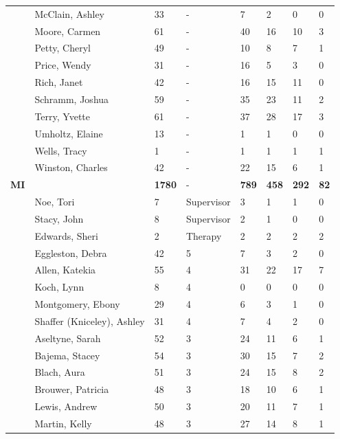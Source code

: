 \documentclass{article}\usepackage[]{graphicx}\usepackage[]{color}
\begin{document}
{\begin{longtable} { >{\raggedright}p{}p{}p{}p{}p{}p{}p{}p{}}
   \rowcolor[gray]{0.90} & McClain, Ashley & 33 & - & 7 & 2 & 0 & 0 \\ 
   \rowcolor[gray]{0.90} & Moore, Carmen & 61 & - & 40 & 16 & 10 & 3 \\ 
   \rowcolor[gray]{0.90} & Petty, Cheryl & 49 & - & 10 & 8 & 7 & 1 \\ 
   & Price, Wendy & 31 & - & 16 & 5 & 3 & 0 \\ 
   & Rich, Janet & 42 & - & 16 & 15 & 11 & 0 \\ 
   & Schramm, Joshua & 59 & - & 35 & 23 & 11 & 2 \\ 
   \rowcolor[gray]{0.90} & Terry, Yvette & 61 & - & 37 & 28 & 17 & 3 \\ 
   \rowcolor[gray]{0.90} & Umholtz, Elaine & 13 & - & 1 & 1 & 0 & 0 \\ 
   \rowcolor[gray]{0.90} & Wells, Tracy & 1 & - & 1 & 1 & 1 & 1 \\ 
   & Winston, Charles & 42 & - & 22 & 15 & 6 & 1 \\ 
   \hline
\textbf{MI} &  & \textbf{1780} & - & \textbf{789} & \textbf{458} & \textbf{292} & \textbf{82} \\ 
   & Noe, Tori & 7 & Supervisor & 3 & 1 & 1 & 0 \\ 
   \rowcolor[gray]{0.90} & Stacy, John & 8 & Supervisor & 2 & 1 & 0 & 0 \\ 
   \rowcolor[gray]{0.90} & Edwards, Sheri & 2 & Therapy & 2 & 2 & 2 & 2 \\ 
   \rowcolor[gray]{0.90} & Eggleston, Debra & 42 & 5 & 7 & 3 & 2 & 0 \\ 
   & Allen, Katekia & 55 & 4 & 31 & 22 & 17 & 7 \\ 
   & Koch, Lynn & 8 & 4 & 0 & 0 & 0 & 0 \\ 
   & Montgomery, Ebony & 29 & 4 & 6 & 3 & 1 & 0 \\ 
   \rowcolor[gray]{0.90} & Shaffer (Kniceley), Ashley & 31 & 4 & 7 & 4 & 2 & 0 \\ 
   \rowcolor[gray]{0.90} & Aseltyne, Sarah & 52 & 3 & 24 & 11 & 6 & 1 \\ 
   \rowcolor[gray]{0.90} & Bajema, Stacey & 54 & 3 & 30 & 15 & 7 & 2 \\ 
   & Blach, Aura & 51 & 3 & 24 & 15 & 8 & 2 \\ 
   & Brouwer, Patricia & 48 & 3 & 18 & 10 & 6 & 1 \\ 
   & Lewis, Andrew & 50 & 3 & 20 & 11 & 7 & 1 \\ 
   \rowcolor[gray]{0.90} & Martin, Kelly & 48 & 3 & 27 & 14 & 8 & 1 \\ 

\end{longtable}}
\end{document}
